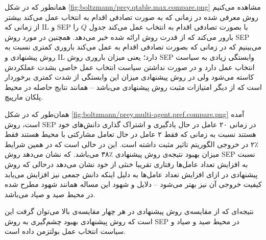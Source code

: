 
 همانطور که در شکل
\ref{fig:boltzmann/prey.qtable.max.compare.png}
مشاهده می‌کنیم روش معرفی شده در زمانی که به صورت تصادفی اقدام به انتخاب عمل می‌کند بیشتر از زمانی که IL و SEP با بصورت تصادفی اقدام به انتخاب عمل می‌کند جدول $Q$ را بارور می‌کند که از قدرت روش ارائه شده خبر می‌دهد. همچنین در مورد روش SEP می‌بینیم که در زمانی که بصورت تصادفی اقدام به عمل می‌کند باروری کمتری نسبت به روش پیشنهادی و IL دارد؛ یعنی میزان باروری روش SEP وابستگی زیادی به سیاست انتخاب عمل دارد و در صورت نداشتن سیاست انتخاب عمل خاصی بشدت عملکردش کاسته می‌شود ولی در روش پیشنهادی میزان این وابستگی از شدت کمتری برخوردار است که از دیگر امتیازات مثبت روش پیشنهادی می‌باشد -- همانند نتایج حاصله در محیط پلکان مارپیچ.


همان‌طور که در شکل
\ref{fig:boltzmann/prey.multi-agent.pref.compare.png}
آمده است، روش SEP در زمانی ۲۰ عامل در حال یادگیری و اشتراک گذاری دانش‌های خود هستند نسبت به زمانی که فقط ۲ عامل در حال تعامل مشارکتی با محیط هستند فقط ٪۲ در خروجی الگوریتم تاثیر مثبت داشته است. این در حالی است که در همین شرایط میزان بهبود نتیجه‌ی روش پیشنهادی ٪۳۸ می‌باشد. که نشان می‌دهد روش SEP نسبت به افزایش تعداد عامل‌ها رفتاری تقریبا خنثی از خود نشان می‌دهد درحالی که روش پیشنهادی در ازای افزایش تعداد عامل‌ها به دلیل اینکه دانش جمعی نیز افزایش می‌یابد کیفیت خروجی آن نیز بهتر می‌شود -- دلایل و شهود این مساله همانند شهود مطرح شده در محیط صید و صیاد می‌باشد.


 نتیجه‌ای که از مقایسه‌ی روش پیشنهادی در هر چهار مقایسه‌ی بالا می‌توان گرفت این است که روش پیشنهادی بهبود چشم‌گیری به روش SEP در محیط صید و صیاد و سیاست انتخاب عمل بولتزمن داده است.